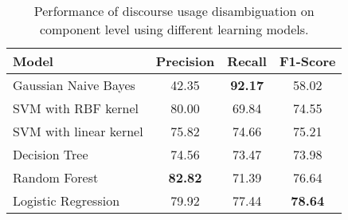 \begin{table}[ht]
\centering
\begin{tabular}{|l|c|c|c|}
\hline

    Model                  &     Precision &     Recall &     F1-Score \\ \hline
    Gaussian Naive Bayes   &     42.35     & \bf 92.17  &     58.02    \\ \hline
    SVM with RBF kernel    &     80.00     &     69.84  &     74.55    \\ \hline
    SVM with linear kernel &     75.82     &     74.66  &     75.21    \\ \hline
    Decision Tree          &     74.56     &     73.47  &     73.98    \\ \hline
    Random Forest          & \bf 82.82     &     71.39  &     76.64    \\ \hline
    Logistic Regression    &     79.92     &     77.44  & \bf 78.64    \\ \hline

\end{tabular}
\caption{\label{t:recognition-models} Performance of discourse usage
disambiguation on component level using different learning models. }
\end{table}
